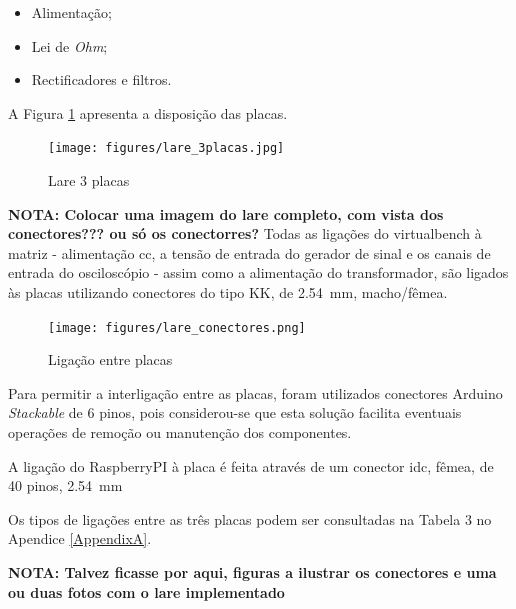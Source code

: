 \begin{itemize}
	\item Alimentação;
	\item Lei de \textit{Ohm};
	\item Rectificadores e filtros.
\end{itemize}

A Figura \ref{fig:3placas} apresenta a disposição das placas.

\begin{figure}[hbtp]
	\centering
	\texttt{[image: figures/lare\_3placas.jpg]}
	\caption{Lare 3 placas }
	\label{fig:3placas}
\end{figure}

\textbf{NOTA: Colocar uma imagem do lare completo, com vista dos conectores??? ou só os conectorres?} Todas as ligações do \acrshort{virtualbench} à matriz - alimentação \acrshort{cc}, a tensão de entrada do gerador de sinal e os canais de entrada do osciloscópio - assim como a alimentação do transformador, são ligados às placas utilizando conectores do tipo KK, de \SI{2,54}{\mm}, macho/fêmea.

\begin{figure}[hbtp]
	\centering
	\texttt{[image: figures/lare\_conectores.png]}
	\caption{Ligação entre placas }
	\label{fig:ligacaoplacas}
\end{figure}

Para permitir a interligação entre as placas, foram utilizados conectores Arduino \textit{Stackable} de 6 pinos, pois considerou-se que esta solução facilita eventuais operações de remoção ou manutenção dos componentes.

A ligação do \gls{RaspberryPI} à placa é feita através de um conector \acrfull{idc}, fêmea, de 40 pinos, \SI{2,54}{\mm}

Os tipos de ligações entre as três placas podem ser consultadas na Tabela 3 no Apendice \ref{AppendixA}. 

\textbf{NOTA: Talvez ficasse por aqui, figuras a ilustrar os conectores e uma ou duas fotos com o lare implementado}

